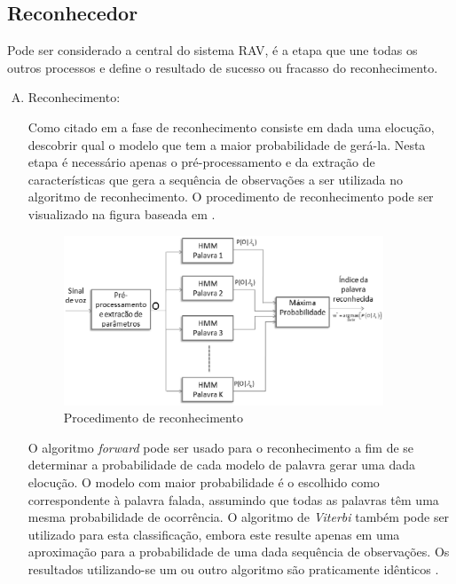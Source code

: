 \subsection{Reconhecedor}
Pode ser considerado a central do sistema RAV, é a etapa que une todas os outros processos e define o resultado de sucesso ou fracasso do reconhecimento.

\begin{enumerate}[A)]
\item Reconhecimento:

Como citado em  a fase de reconhecimento consiste em dada uma elocução, descobrir qual o modelo que tem a maior probabilidade de gerá-la. Nesta etapa é necessário apenas o pré-processamento e da extração de características que gera a sequência de observações a ser utilizada no algoritmo de reconhecimento. O procedimento de
reconhecimento pode ser visualizado na figura baseada em \cite{TutorialHmmRabiner}.

\begin{figure}[H]
\includegraphics[width=0.9\textwidth]{graficos/reconhecimento.eps}
\caption{Procedimento de reconhecimento}
\end{figure}

O algoritmo \textit{forward} pode ser usado para o reconhecimento a fim de se determinar a probabilidade de cada modelo de palavra gerar uma dada elocução. O modelo com maior probabilidade é o escolhido como correspondente à palavra falada, assumindo que todas as palavras têm uma mesma probabilidade de ocorrência. O algoritmo de \textit{Viterbi} também pode ser utilizado para esta classificação, embora este resulte apenas em uma aproximação
para a probabilidade de uma dada sequência de observações. Os resultados utilizando-se um ou outro algoritmo são praticamente idênticos \cite{RavIsolAnderson}.
\end{enumerate}

